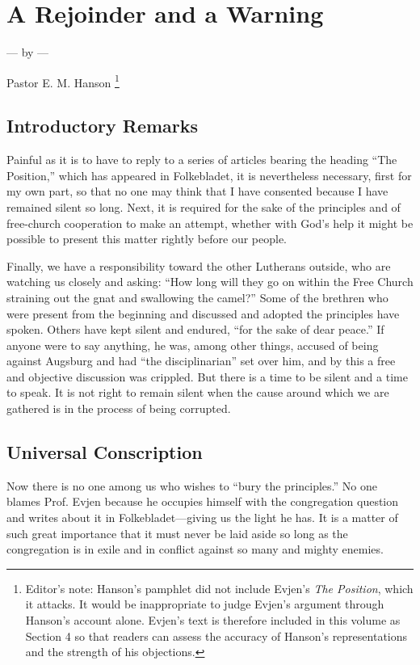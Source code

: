 
\section{A Rejoinder and a Warning}

— by —

Pastor E. M. Hanson \footnote{Editor's note: Hanson's pamphlet did not include Evjen's \textit{The Position}, which it attacks. It would be inappropriate to judge Evjen's argument through Hanson's account alone. Evjen's text is therefore included in this volume as Section 4 so that readers can assess the accuracy of Hanson's representations and the strength of his objections.}

\subsection{Introductory Remarks}

Painful as it is to have to reply to a series of articles bearing the heading “The Position,” which has appeared in Folkebladet, it is nevertheless necessary, first for my own part, so that no one may think that I have consented because I have remained silent so long. Next, it is required for the sake of the principles and of free-church cooperation to make an attempt, whether with God’s help it might be possible to present this matter rightly before our people.

Finally, we have a responsibility toward the other Lutherans outside, who are watching us closely and asking: “How long will they go on within the Free Church straining out the gnat and swallowing the camel?” Some of the brethren who were present from the beginning and discussed and adopted the principles have spoken. Others have kept silent and endured, “for the sake of dear peace.” If anyone were to say anything, he was, among other things, accused of being against Augsburg and had “the disciplinarian” set over him, and by this a free and objective discussion was crippled. But there is a time to be silent and a time to speak. It is not right to remain silent when the cause around which we are gathered is in the process of being corrupted.

\subsection{Universal Conscription}

Now there is no one among us who wishes to “bury the principles.” No one blames Prof. Evjen because he occupies himself with the congregation question and writes about it in Folkebladet—giving us the light he has. It is a matter of such great importance that it must never be laid aside so long as the congregation is in exile and in conflict against so many and mighty enemies.

